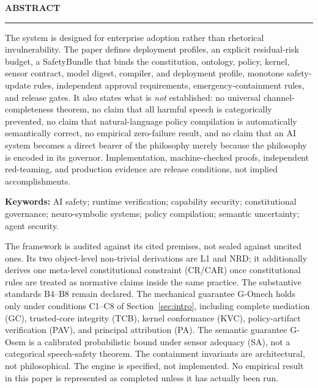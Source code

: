 \documentclass[11pt]{article}
\def\ensuremath#1{#1}%
\def\mathrm#1{#1}%
\def\textsuperscript#1{#1}%
\newcommand{\Gmech}{G-O\textsuperscript{mech}}
\newcommand{\Gsem}{G-O\textsuperscript{sem}}
\newcommand{\CR}{\ensuremath{\mathrm{CR}}}
\newcommand{\CAR}{\ensuremath{\mathrm{CAR}}}
\newcommand{\SafetyBundle}{\textsf{SafetyBundle}}
\newenvironment{CanonAbstract}{%
  \begin{center}
  {\sffamily\footnotesize\bfseries\color{seriesMuted}\MakeUppercase{Abstract}}\\[-0.05em]
  {\color{seriesAccent}\rule{0.16\textwidth}{0.75pt}}
  \end{center}
  \begin{tcolorbox}[
    enhanced,
    breakable,
    colback=white,
    colframe=seriesRule,
    boxrule=0.4pt,
    leftrule=2.2pt,
    arc=1pt,
    left=12pt,right=12pt,top=9pt,bottom=9pt,
    before skip=5pt,after skip=4pt
  ]
  \small
}{%
  \end{tcolorbox}
}
\begin{document}
\begin{CanonAbstract}
The system is designed for enterprise adoption rather than rhetorical invulnerability. The paper defines deployment profiles, an explicit residual-risk budget, a \SafetyBundle{} that binds the constitution, ontology, policy, kernel, sensor contract, model digest, compiler, and deployment profile, monotone safety-update rules, independent approval requirements, emergency-containment rules, and release gates. It also states what is \emph{not} established: no universal channel-completeness theorem, no claim that all harmful speech is categorically prevented, no claim that natural-language policy compilation is automatically semantically correct, no empirical zero-failure result, and no claim that an AI system becomes a direct bearer of the philosophy merely because the philosophy is encoded in its governor. Implementation, machine-checked proofs, independent red-teaming, and production evidence are release conditions, not implied accomplishments.
\end{CanonAbstract}

\vspace{0.4em}
{\small\sffamily\textbf{Keywords:} AI safety; runtime verification; capability security; constitutional governance; neuro-symbolic systems; policy compilation; semantic uncertainty; agent security.\par}

\begin{excludedclaims}
The framework is audited against its cited premises, not sealed against uncited ones. Its two object-level non-trivial derivations are L1 and NRD; it additionally derives one meta-level constitutional constraint (\CR{}/\CAR{}) once constitutional rules are treated as normative claims inside the same practice. The substantive standards B4--B8 remain declared. The mechanical guarantee \Gmech{} holds only under conditions C1--C8 of Section~\ref{sec:intro}, including complete mediation (GC), trusted-core integrity (TCB), kernel conformance (KVC), policy-artifact verification (PAV), and principal attribution (PA). The semantic guarantee \Gsem{} is a calibrated probabilistic bound under sensor adequacy (SA), not a categorical speech-safety theorem. The containment invariants are architectural, not philosophical. The engine is specified, not implemented. No empirical result in this paper is represented as completed unless it has actually been run.
\end{excludedclaims}

\clearpage
\tableofcontents
\clearpage
{}
\setcounter{page}{1}
\end{document}
